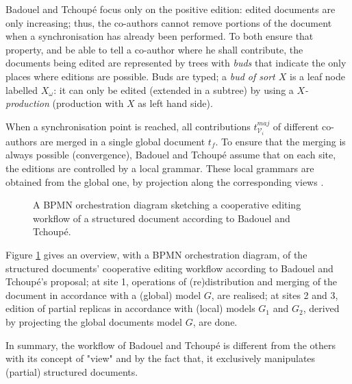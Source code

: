 Badouel and Tchoup\'e focus only on the positive edition: edited documents are only increasing; thus, the co-authors cannot remove portions of the document when a synchronisation has already been performed. To both ensure that property, and be able to tell a co-author where he shall contribute, the documents being edited are represented by trees with \textit{buds} that indicate the only places where editions are possible.
Buds are typed; a \textit{bud of sort $X$} is a leaf node labelled $X_\omega$: it can only be edited (extended in a subtree) by using a \textit{$X$-production} (production with $X$ as left hand side).

When a synchronisation point is reached, all contributions $t_{\mathcal{V}_i}^{maj}$ of different co-authors are merged in a single global document $t_f$. To ensure that the merging is always possible (convergence), Badouel and Tchoup\'e assume that on each site, the editions are controlled by a local grammar. These local grammars are obtained from the global one, by projection along the corresponding views \cite{badouelTchoupeCmcs, tchoupeAtemkeng2}.
\begin{figure}[ht!]
	\noindent
	\caption{A BPMN orchestration diagram sketching a cooperative editing workflow of a structured document according to Badouel and Tchoup\'e.}
	\label{chap2:fig:badouel-tchoupe-workflow}
\end{figure}

Figure \ref{chap2:fig:badouel-tchoupe-workflow} gives an overview, with a BPMN orchestration diagram, of the structured documents' cooperative editing workflow according to Badouel and Tchoup\'e's proposal; at site 1, operations of (re)distribution and merging of the document in accordance with a (global) model $G$, are realised; at sites 2 and 3, edition of partial replicas in accordance with (local) models $G_1$ and $G_2$, derived by projecting the global documents model $G$, are done.

In summary, the workflow of Badouel and Tchoup\'e is different from the others with its concept of "view" and by the fact that, it exclusively manipulates (partial) structured documents.



